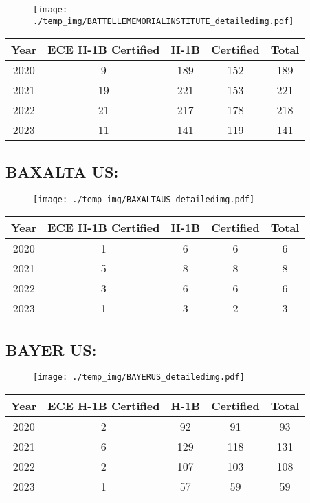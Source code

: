 \documentclass{article}%
\begin{document}
\begin{figure}[htbp]%
\centering%
\texttt{[image: ./temp\_img/BATTELLEMEMORIALINSTITUTE\_detailedimg.pdf]}%
\end{figure}

%
\begin{longtable}{c|c|c|c|c}%
\hline%
Year&ECE H{-}1B Certified&H{-}1B&Certified&Total\\%
\hline%
2020&9&189&152&189\\%
\hline%
2021&19&221&153&221\\%
\hline%
2022&21&217&178&218\\%
\hline%
2023&11&141&119&141\\%
\hline%
\end{longtable}

%
\newpage%
\subsection{BAXALTA US:}%
\label{subsec:BAXALTAUS}%
\label{BAXALTAUSdetailed}%


\begin{figure}[htbp]%
\centering%
\texttt{[image: ./temp\_img/BAXALTAUS\_detailedimg.pdf]}%
\end{figure}

%
\begin{longtable}{c|c|c|c|c}%
\hline%
Year&ECE H{-}1B Certified&H{-}1B&Certified&Total\\%
\hline%
2020&1&6&6&6\\%
\hline%
2021&5&8&8&8\\%
\hline%
2022&3&6&6&6\\%
\hline%
2023&1&3&2&3\\%
\hline%
\end{longtable}

%
\newpage%
\subsection{BAYER US:}%
\label{subsec:BAYERUS}%
\label{BAYERUSdetailed}%


\begin{figure}[htbp]%
\centering%
\texttt{[image: ./temp\_img/BAYERUS\_detailedimg.pdf]}%
\end{figure}

%
\begin{longtable}{c|c|c|c|c}%
\hline%
Year&ECE H{-}1B Certified&H{-}1B&Certified&Total\\%
\hline%
2020&2&92&91&93\\%
\hline%
2021&6&129&118&131\\%
\hline%
2022&2&107&103&108\\%
\hline%
2023&1&57&59&59\\%
\hline%
\end{longtable}
\end{document}
